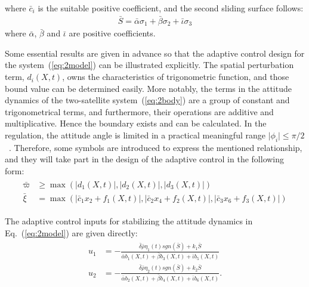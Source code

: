 where $\bar{c}_i$ is the suitable positive coefficient, and the second sliding surface follows:
\begin{align}
\bar{S} = \bar{\alpha}\sigma_1+ \bar{\beta}\sigma_2+\bar{\iota}\sigma_3\label{eq:bar S}
\end{align}
where $\bar{\alpha}$, $\bar{\beta}$ and $\bar{\iota}$ are positive coefficients.
\begin{remark}
Some essential results are given in advance so that the adaptive control design for the system~(\ref{eq:2model}) can be illustrated explicitly. The spatial perturbation term, $d_i(X,t)$, owns the characteristics of trigonometric function, and those bound value can be determined easily. More notably, the terms in the attitude dynamics of the two-satellite system~(\ref{eq:2body}) are a group of constant and trigonometrical terms, and furthermore, their operations are additive and multiplicative. Hence the boundary exists and can be calculated. In the regulation, the attitude angle is limited in a practical meaningful range $\vert \phi_i\vert\le\pi/2$~\cite{chung2008propellant2}. Therefore, some symbols are introduced to express the mentioned relationship, and they will take part in the design of the adaptive control in the following form:\label{rem:2}
\begin{align}
\begin{split}
\bar\varpi &\ge \max(\vert d_1(X,t)\vert,\vert d_2(X,t)\vert,\vert d_3(X,t)\vert)\\
\bar\xi &=  \max(\vert \bar c_1x_2 + f_1(X,t)\vert,\vert \bar c_2x_4 + f_2(X,t)\vert,\vert \bar c_3x_6 + f_3(X,t)\vert)
\end{split}
\end{align}
\end{remark}\par
The adaptive control inputs for stabilizing the attitude dynamics in Eq.~(\ref{eq:2model}) are given directly:
\begin{align}
\begin{split}
u_1 &= -\frac{\bar\delta\bar\rho\eta_1(t)sgn(\bar S)+k_1\bar S}{\bar\alpha b_1(X,t) + \bar\beta b_3(X,t) + \bar\iota b_5(X,t)}\\
u_2 &= -\frac{\bar\delta\bar\rho\eta_2(t)sgn(\bar S)+k_2\bar S}{\bar\alpha b_2(X,t) + \bar\beta b_4(X,t) + \bar\iota b_6(X,t)}.
\end{split}\label{eq:u1u2}
\end{align}\par
